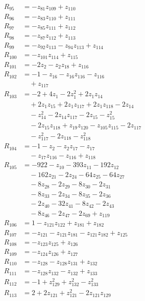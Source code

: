 \begin{align*}
R_{95} &= -z_{81}z_{109} +z_{110} \\
R_{96} &= -z_{83}z_{110} +z_{111} \\
R_{97} &= -z_{85}z_{111} +z_{112} \\
R_{98} &= -z_{87}z_{112} +z_{113} \\
R_{99} &= -z_{92}z_{113} -z_{94}z_{113} +z_{114} \\
R_{100} &= -z_{101}z_{114} +z_{115} \\
R_{101} &= -2z_{2} -z_{2}z_{18} +z_{116} \\
R_{102} &= -1 -z_{16} -z_{16}z_{116} -z_{116} \\
&\quad +z_{117} \\
R_{103} &= -2 +4z_{1} -2z_{1}^{2} +2z_{1}z_{14} \\
&\quad +2z_{1}z_{15} +2z_{1}z_{117} +2z_{1}z_{118} -2z_{14} \\
&\quad -z_{14}^{2} -2z_{14}z_{117} -2z_{15} -z_{15}^{2} \\
&\quad -2z_{15}z_{118} +z_{19}z_{120} -z_{105}z_{115} -2z_{117} \\
&\quad -z_{117}^{2} -2z_{118} -z_{118}^{2} \\
R_{104} &= -1 -z_{2} -z_{2}z_{17} -z_{17} \\
&\quad -z_{17}z_{116} -z_{116} +z_{118} \\
R_{105} &= -922 -z_{10} -393z_{11} -192z_{12} \\
&\quad -162z_{21} -2z_{24} -64z_{25} -64z_{27} \\
&\quad -8z_{28} -2z_{29} -8z_{30} -2z_{31} \\
&\quad -8z_{33} -2z_{34} -8z_{35} -2z_{36} \\
&\quad -2z_{40} -32z_{41} -8z_{42} -2z_{43} \\
&\quad -8z_{46} -2z_{47} -2z_{69} +z_{119} \\
R_{106} &= 1 -z_{121}z_{122} +z_{181} +z_{182} \\
R_{107} &= -z_{121} -z_{121}z_{181} -z_{121}z_{182} +z_{125} \\
R_{108} &= -z_{123}z_{125} +z_{126} \\
R_{109} &= -z_{124}z_{126} +z_{127} \\
R_{110} &= -z_{128} -z_{128}z_{131} +z_{132} \\
R_{111} &= -z_{128}z_{132} -z_{132} +z_{133} \\
R_{112} &= -1 +z_{129}^{2} +z_{132}^{2} -z_{133}^{2} \\
R_{113} &= 2 +2z_{121} +z_{121}^{2} -2z_{121}z_{129} \\

\end{align*}
